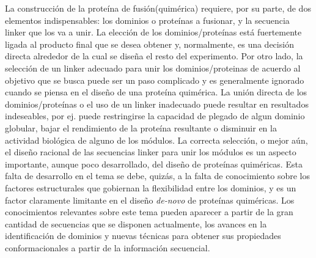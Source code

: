 La construcción de la proteína de fusión(quimérica) requiere, por su parte, de dos elementos indispensables: 
los dominios o proteínas a fusionar, y la secuencia linker que los va a unir.
La elección de los dominios/proteínas está fuertemente ligada al producto final que se desea obtener y, normalmente, es una decisión directa alrededor de la cual se diseña el resto del experimento.
Por otro lado, la selección de un linker adecuado para unir los dominios/proteinas de acuerdo al objetivo que se busca puede ser un paso complicado y es generalmente ignorado cuando se piensa en el diseño de una proteína quimérica.
La unión directa de los dominios/proteínas o el uso de un linker inadecuado puede resultar en resultados indeseables, por ej. puede restringirse la capacidad de plegado de algun dominio globular, 
bajar el rendimiento de la proteína resultante o disminuir en la actividad biológica de alguno de los módulos.
La correcta selección, o mejor aún, el diseño racional de las secuencias linker para unir los módulos es un aspecto importante, aunque poco desarrollado, del diseño de proteínas quiméricas. 
Esta falta de desarrollo en el tema se debe, quizás, a la falta de conocimiento sobre los factores estructurales que gobiernan la flexibilidad entre los dominios, y es un factor claramente 
limitante en el diseño \textit{de-novo} de proteínas quiméricas. 
Los conocimientos relevantes sobre este tema pueden aparecer a partir de la gran cantidad de secuencias que se disponen actualmente, los avances en 
la identificación de dominios y nuevas técnicas para obtener sus propiedades conformacionales a partir de la información secuencial.






%






